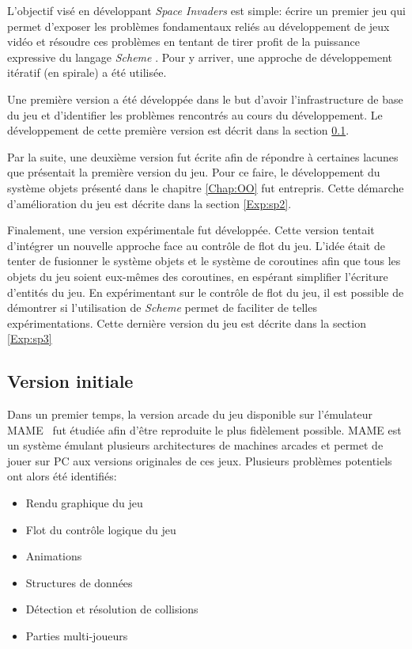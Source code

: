 \documentclass[12pt,twoside,letterpaper,francais]{book}
\newcommand{\si}{{\textit{Space Invaders }}}
\newcommand{\Schemelang}{{\textit{Scheme }}}
\begin{document}
L'objectif visé en développant \si est simple: écrire un premier jeu
qui permet d'exposer les problèmes fondamentaux reliés au
développement de jeux vidéo et résoudre ces problèmes en tentant de
tirer profit de la puissance expressive du langage \Schemelang. Pour y
arriver, une approche de développement itératif (en spirale) a été
utilisée.

Une première version a été développée dans le but d'avoir
l'infrastructure de base du jeu et d'identifier les problèmes
rencontrés au cours du développement. Le développement de cette
première version est décrit dans la section \ref{Exp:sp1}.

Par la suite, une deuxième version fut écrite afin de répondre à
certaines lacunes que présentait la première version du jeu. Pour ce
faire, le développement du système objets présenté dans le chapitre
\ref{Chap:OO} fut entrepris. Cette démarche d'amélioration du jeu est
décrite dans la section \ref{Exp:sp2}.

Finalement, une version expérimentale fut développée. Cette version
tentait d'intégrer un nouvelle approche face au contrôle de flot du
jeu. L'idée était de tenter de fusionner le système objets et le
système de coroutines afin que tous les objets du jeu soient eux-mêmes
des coroutines, en espérant simplifier l'écriture d'entités du jeu. En
expérimentant sur le contrôle de flot du jeu, il est possible de
démontrer si l'utilisation de \Schemelang permet de faciliter de
telles expérimentations. Cette dernière version du jeu est décrite
dans la section \ref{Exp:sp3}


\FloatBarrier
\subsection{Version initiale} \label{Exp:sp1}
Dans un premier temps, la version arcade du jeu disponible sur
l'émulateur MAME~\cite{MAME} fut étudiée afin d'être reproduite le
plus fidèlement possible. MAME est un système émulant plusieurs
architectures de machines arcades et permet de jouer sur PC aux
versions originales de ces jeux. Plusieurs problèmes potentiels ont
alors été identifiés:

\begin{itemize}
\item Rendu graphique du jeu
\item Flot du contrôle logique du jeu
\item Animations
\item Structures de données
\item Détection et résolution de collisions
\item Parties multi-joueurs
\end{itemize}
\end{document}
